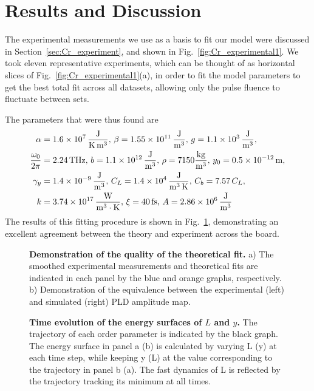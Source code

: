 \section{Results and Discussion \label{sec:Cr_results}}
The experimental measurements we use as a basis to fit our model were discussed in Section~\ref{sec:Cr_experiment}, and shown in Fig.~\ref{fig:Cr_experimental1}.
We took eleven representative experiments, which can be thought of as horizontal slices of Fig.~\ref{fig:Cr_experimental1}(a), in order to fit the model parameters to get the best total fit across all datasets, allowing only the pulse fluence to fluctuate between sets.

The parameters that were thus found are
\begin{align}
	\alpha &= \SI{1.6e7} {\rm \frac{J}{K\, m^3}},\, \beta = \SI{1.55e11} {\rm \frac{J}{m^3}},\, g = \SI{1.1e3}{\rm \frac{J}{m^3}}, \\
	\frac{\omega_0}{2\pi} &= 2.24\, {\rm THz},\, b = \SI{1.1e12} {\rm \frac{J}{m^3}},\, \rho = 7150 {\rm \frac{kg}{m^3}},\, y_0 = \SI{0.5e-12} {\rm m},\\
	\gamma_y &= \SI{1.4e-9}{\rm \frac{J}{m^3}}, \, C_L = \SI{1.4e4}{\rm \frac{J}{m^3\,K}},\, C_b = 7.57\,C_L,\\
	k &= \SI{3.74e17} {\rm \frac{W}{m^3\cdot K}},\, \xi = 40\,{\rm fs},\,A = \SI{2.86e6}{\rm \frac{J}{m^3}}
\end{align}
The results of this fitting procedure is shown in Fig.~\ref{fig:Cr_theoretical_fit}, demonstrating an excellent agreement between the theory and experiment across the board.
\begin{figure}
\caption{\label{fig:Cr_theoretical_fit} {\bf Demonstration of the quality of the theoretical fit.} a) The smoothed experimental measurements and theoretical fits are indicated in each panel by the blue and orange graphs, respectively. b) Demonstration of the equivalence between the experimental (left) and simulated (right) PLD amplitude map.}
\end{figure}
\begin{figure}
	\centering
	\caption{\label{fig:Cr_energy_surfaces}{\bf Time evolution of the energy surfaces of $L$ and $y$.} The trajectory of each order parameter is indicated by the black graph. The energy surface in panel a (b) is calculated by varying L (y) at each time step, while keeping y (L) at the value corresponding to the trajectory in panel b (a). The fast dynamics of L is reflected by the trajectory tracking its minimum at all times.}
\end{figure}
